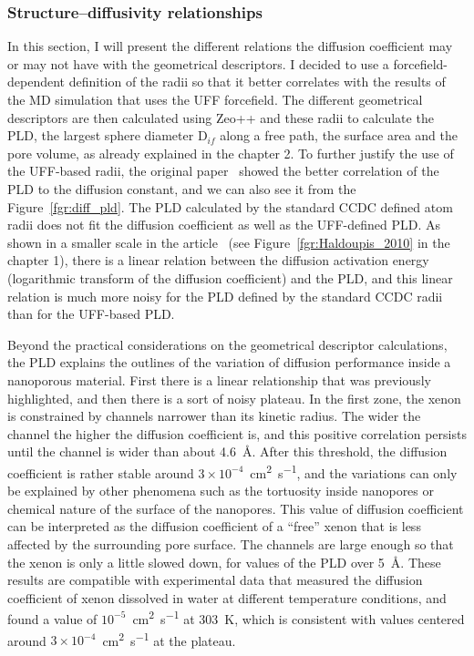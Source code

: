 \documentclass[main]{subfiles}
\begin{document}
\subsubsection{Structure--diffusivity relationships}\label{sct:xenon_diff_screen}

In this section, I will present the different relations the diffusion coefficient may or may not have with the geometrical descriptors. I decided to use a forcefield-dependent definition of the radii so that it better correlates with the results of the MD simulation that uses the UFF forcefield. The different geometrical descriptors are then calculated using Zeo++ and these radii to calculate the PLD, the largest sphere diameter D$_{if}$ along a free path, the surface area and the pore volume, as already explained in the chapter 2. To further justify the use of the UFF-based radii, the original paper~\cite{Hung_2021} showed the better correlation of the PLD to the diffusion constant, and we can also see it from the Figure~\ref{fgr:diff_pld}. The PLD calculated by the standard CCDC defined atom radii does not fit the diffusion coefficient as well as the UFF-defined PLD. As shown in a smaller scale in the article~\cite{Haldoupis_2010} (see Figure~\ref{fgr:Haldoupis_2010} in the chapter 1), there is a linear relation between the diffusion activation energy (logarithmic transform of the diffusion coefficient) and the PLD, and this linear relation is much more noisy for the PLD defined by the standard CCDC radii than for the UFF-based PLD.

Beyond the practical considerations on the geometrical descriptor calculations, the PLD explains the outlines of the variation of diffusion performance inside a nanoporous material. First there is a linear relationship that was previously highlighted, and then there is a sort of noisy plateau. In the first zone, the xenon is constrained by channels narrower than its kinetic radius. The wider the channel the higher the diffusion coefficient is, and this positive correlation persists until the channel is wider than about \SI{4.6}{\angstrom}. After this threshold, the diffusion coefficient is rather stable around $3\times 10^{-4}$~\si{\square\cm\per\s}, and the variations can only be explained by other phenomena such as the tortuosity inside nanopores or chemical nature of the surface of the nanopores. This value of diffusion coefficient can be interpreted as the diffusion coefficient of a ``free'' xenon that is less affected by the surrounding pore surface. The channels are large enough so that the xenon is only a little slowed down, for values of the PLD over \SI{5}{\angstrom}. These results are compatible with experimental data that measured the diffusion coefficient of xenon dissolved in water at different temperature conditions, and found a value of $10^{-5}$~\si{\square\cm\per\s} at \SI{303}{\kelvin},\autocite{Wise1968} which is consistent with values centered around $3\times 10^{-4}$~\si{\square\cm\per\s} at the plateau.
\end{document}

